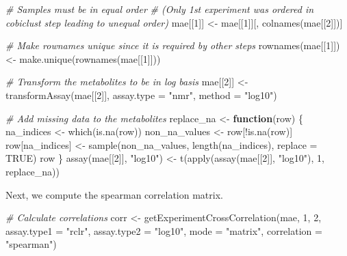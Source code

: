 \documentclass[
]{book}
\newenvironment{Shaded}{\begin{snugshade}}{\end{snugshade}}
\newcommand{\AttributeTok}[1]{\textcolor[rgb]{0.77,0.63,0.00}{#1}}
\newcommand{\CommentTok}[1]{\textcolor[rgb]{0.56,0.35,0.01}{\textit{#1}}}
\newcommand{\ConstantTok}[1]{\textcolor[rgb]{0.00,0.00,0.00}{#1}}
\newcommand{\ControlFlowTok}[1]{\textcolor[rgb]{0.13,0.29,0.53}{\textbf{#1}}}
\newcommand{\DecValTok}[1]{\textcolor[rgb]{0.00,0.00,0.81}{#1}}
\newcommand{\FunctionTok}[1]{\textcolor[rgb]{0.00,0.00,0.00}{#1}}
\newcommand{\NormalTok}[1]{#1}
\newcommand{\OtherTok}[1]{\textcolor[rgb]{0.56,0.35,0.01}{#1}}
\newcommand{\SpecialCharTok}[1]{\textcolor[rgb]{0.00,0.00,0.00}{#1}}
\newcommand{\StringTok}[1]{\textcolor[rgb]{0.31,0.60,0.02}{#1}}
\begin{document}
\begin{Shaded}
\begin{Highlighting}[]
\CommentTok{\# Samples must be in equal order}
\CommentTok{\# (Only 1st experiment was ordered in cobiclust step leading to unequal order)}
\NormalTok{mae[[}\DecValTok{1}\NormalTok{]] }\OtherTok{\textless{}{-}}\NormalTok{ mae[[}\DecValTok{1}\NormalTok{]][, }\FunctionTok{colnames}\NormalTok{(mae[[}\DecValTok{2}\NormalTok{]])]}

\CommentTok{\# Make rownames unique since it is required by other steps}
\FunctionTok{rownames}\NormalTok{(mae[[}\DecValTok{1}\NormalTok{]]) }\OtherTok{\textless{}{-}} \FunctionTok{make.unique}\NormalTok{(}\FunctionTok{rownames}\NormalTok{(mae[[}\DecValTok{1}\NormalTok{]]))}

\CommentTok{\# Transform the metabolites to be in log basis}
\NormalTok{mae[[}\DecValTok{2}\NormalTok{]] }\OtherTok{\textless{}{-}} \FunctionTok{transformAssay}\NormalTok{(mae[[}\DecValTok{2}\NormalTok{]], }\AttributeTok{assay.type =} \StringTok{"nmr"}\NormalTok{, }\AttributeTok{method =} \StringTok{"log10"}\NormalTok{)}

\CommentTok{\# Add missing data to the metabolites}
\NormalTok{replace\_na }\OtherTok{\textless{}{-}} \ControlFlowTok{function}\NormalTok{(row) \{}
\NormalTok{    na\_indices }\OtherTok{\textless{}{-}} \FunctionTok{which}\NormalTok{(}\FunctionTok{is.na}\NormalTok{(row))}
\NormalTok{    non\_na\_values }\OtherTok{\textless{}{-}}\NormalTok{ row[}\SpecialCharTok{!}\FunctionTok{is.na}\NormalTok{(row)]}
\NormalTok{    row[na\_indices] }\OtherTok{\textless{}{-}} \FunctionTok{sample}\NormalTok{(non\_na\_values, }\FunctionTok{length}\NormalTok{(na\_indices), }\AttributeTok{replace =} \ConstantTok{TRUE}\NormalTok{)}
\NormalTok{    row}
\NormalTok{\}}
\FunctionTok{assay}\NormalTok{(mae[[}\DecValTok{2}\NormalTok{]], }\StringTok{"log10"}\NormalTok{) }\OtherTok{\textless{}{-}} \FunctionTok{t}\NormalTok{(}\FunctionTok{apply}\NormalTok{(}\FunctionTok{assay}\NormalTok{(mae[[}\DecValTok{2}\NormalTok{]], }\StringTok{"log10"}\NormalTok{), }\DecValTok{1}\NormalTok{, replace\_na))}
\end{Highlighting}
\end{Shaded}

Next, we compute the spearman correlation matrix.

\begin{Shaded}
\begin{Highlighting}[]
\CommentTok{\# Calculate correlations}
\NormalTok{corr }\OtherTok{\textless{}{-}} \FunctionTok{getExperimentCrossCorrelation}\NormalTok{(mae, }\DecValTok{1}\NormalTok{, }\DecValTok{2}\NormalTok{, }\AttributeTok{assay.type1 =} \StringTok{"rclr"}\NormalTok{,}
                                      \AttributeTok{assay.type2 =} \StringTok{"log10"}\NormalTok{, }\AttributeTok{mode =} \StringTok{"matrix"}\NormalTok{,}
                                      \AttributeTok{correlation =} \StringTok{"spearman"}\NormalTok{)}
\end{Highlighting}
\end{Shaded}
\end{document}
